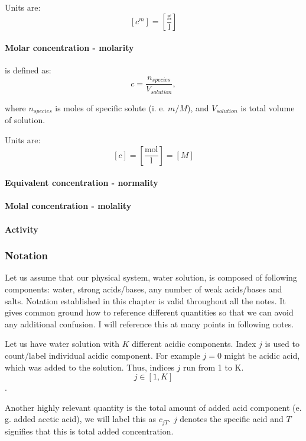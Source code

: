 Units are:
\[\left[c^{m}\right]=\left[\frac{\text{g}}{\text{l}}\right]\]

\paragraph*{Molar concentration - molarity}
is defined as:
\begin{equation}\label{eq:defMolarConc}
    c = \frac{n_{species}}{V_{solution}},
\end{equation}

where $n_{species}$ is moles of specific solute (i. e. $m/M$), and $V_{solution}$ is total volume of solution.

Units are:
\[\left[c\right]=\left[\frac{\text{mol}}{\text{l}}\right]= [M]\]


\paragraph*{Equivalent concentration - normality}
\paragraph*{Molal concentration - molality}
\paragraph*{Activity}


\subsubsection{Notation}

Let us assume that our physical system, water solution, is composed of following components:
water, strong acids/bases, any number of weak acids/bases and salts. Notation established in this
chapter is valid throughout all the notes. It gives common ground how to reference different quantities
so that we can avoid any additional confusion. I will reference this at many points in following notes.

Let us have water solution with $K$ different acidic components. Index $j$ is used to count/label
individual acidic component. For example $j=0$ might be acidic acid, which was added to the solution. Thus, indices $j$ run from 1 to K.
\[j \in [1, K]\].

Another highly relevant quantity is the total amount of added acid component (e. g. added acetic acid), we will label this as $c_{jT}$. $j$ denotes the specific acid and $T$ signifies that this is total added concentration.

